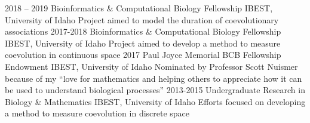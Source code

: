 \documentclass[9pt]{developercv} %
\begin{document}
\vspace{-10 pt}
\begin{entrylist}
    \entry
        {2018 -- 2019}
        {Bioinformatics \& Computational Biology Fellowship}
        {IBEST, University of Idaho}
        {Project aimed to model the duration of coevolutionary associations}
    \entry
        {2017-2018}
        {Bioinformatics \& Computational Biology Fellowship}
        {IBEST, University of Idaho}
        {Project aimed to develop a method to measure coevolution in continuous space}
    \entry
        {2017}
        {Paul Joyce Memorial BCB Fellowship Endowment}
        {IBEST, University of Idaho}
        {Nominated by Professor Scott Nuismer because of my “love for mathematics and helping others to appreciate how it can be used to understand biological processes”}
    \entry
        {2013-2015}
        {Undergraduate Research in Biology \& Mathematics}
        {IBEST, University of Idaho}
        {Efforts focused on developing a method to measure coevolution in discrete space}
\end{entrylist}

\end{document}
